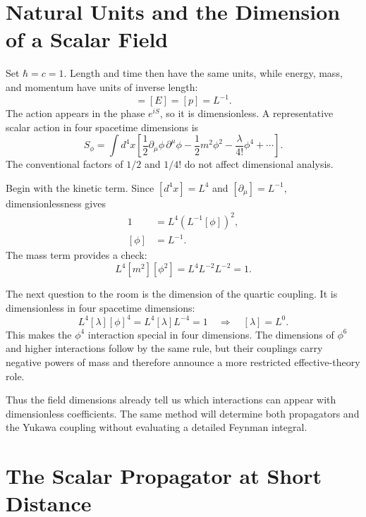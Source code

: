 \section{Natural Units and the Dimension of a Scalar Field}

Set \(\hbar=c=1\). Length and time then have the same units, while energy, mass, and momentum have units of inverse length:
\begin{equation}
[m]=[E]=[p]=L^{-1}.
\end{equation}
The action appears in the phase \(e^{iS}\), so it is dimensionless. A representative scalar action in four spacetime dimensions is
\begin{equation}
S_\phi=\int d^4x\left[
\frac12\partial_\mu\phi\,\partial^\mu\phi
-\frac12m^2\phi^2
-\frac{\lambda}{4!}\phi^4
+\cdots\right].
\end{equation}
The conventional factors of \(1/2\) and \(1/4!\) do not affect dimensional analysis.

Begin with the kinetic term. Since \([d^4x]=L^4\) and \([\partial_\mu]=L^{-1}\), dimensionlessness gives
\begin{align}
1
&=L^4\left(L^{-1}[\phi]\right)^2,\\
[\phi]&=L^{-1}.
\end{align}
The mass term provides a check:
\begin{equation}
L^4[m^2][\phi^2]
=L^4L^{-2}L^{-2}=1.
\end{equation}

The next question to the room is the dimension of the quartic coupling. It is dimensionless in four spacetime dimensions:
\begin{equation}
L^4[\lambda][\phi]^4=L^4[\lambda]L^{-4}=1
\quad\Longrightarrow\quad [\lambda]=L^0.
\end{equation}
This makes the \(\phi^4\) interaction special in four dimensions. The dimensions of \(\phi^6\) and higher interactions follow by the same rule, but their couplings carry negative powers of mass and therefore announce a more restricted effective-theory role.

Thus the field dimensions already tell us which interactions can appear with dimensionless coefficients. The same method will determine both propagators and the Yukawa coupling without evaluating a detailed Feynman integral.

\section{The Scalar Propagator at Short Distance}

